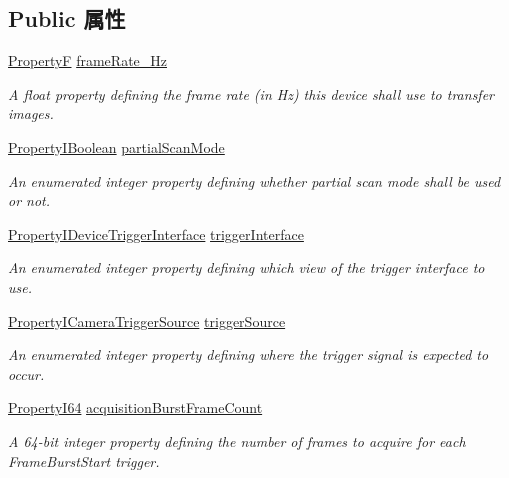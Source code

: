 \subsection*{Public 属性}
\begin{DoxyCompactItemize}
\item 
\hyperlink{group___common_interface_gaf54865fe5a3d5cfd15f9a111b40d09f9}{Property\+F} \hyperlink{classmv_i_m_p_a_c_t_1_1acquire_1_1_camera_settings_blue_c_o_u_g_a_r_a56f237d32d0634054baf9f760c9d4c87}{frame\+Rate\+\_\+\+Hz}
\begin{DoxyCompactList}\small\item\em A float property defining the frame rate (in Hz) this device shall use to transfer images. \end{DoxyCompactList}\item 
\hyperlink{group___common_interface_ga44f9437e24b21b6c93da9039ec6786aa}{Property\+I\+Boolean} \hyperlink{classmv_i_m_p_a_c_t_1_1acquire_1_1_camera_settings_blue_c_o_u_g_a_r_af8680084295e56406aa41e2162204d79}{partial\+Scan\+Mode}
\begin{DoxyCompactList}\small\item\em An enumerated integer property defining whether partial scan mode shall be used or not. \end{DoxyCompactList}\item 
\hyperlink{group___device_specific_interface_gabc51afc4a0e6c169f166ee32bbe45b78}{Property\+I\+Device\+Trigger\+Interface} \hyperlink{classmv_i_m_p_a_c_t_1_1acquire_1_1_camera_settings_blue_c_o_u_g_a_r_a75591b5a8fc64719066e621a3b9adf47}{trigger\+Interface}
\begin{DoxyCompactList}\small\item\em An enumerated integer property defining which view of the trigger interface to use. \end{DoxyCompactList}\item 
\hyperlink{group___device_specific_interface_ga40354af1fd85b454ec1b4e5ca007755d}{Property\+I\+Camera\+Trigger\+Source} \hyperlink{classmv_i_m_p_a_c_t_1_1acquire_1_1_camera_settings_blue_c_o_u_g_a_r_adee3dae10aa14fd0f808d94133c847b4}{trigger\+Source}
\begin{DoxyCompactList}\small\item\em An enumerated integer property defining where the trigger signal is expected to occur. \end{DoxyCompactList}\item 
\hyperlink{group___common_interface_ga81749b2696755513663492664a18a893}{Property\+I64} \hyperlink{classmv_i_m_p_a_c_t_1_1acquire_1_1_camera_settings_blue_c_o_u_g_a_r_a7c28e067bd7ce1304cc681ac1f176c24}{acquisition\+Burst\+Frame\+Count}
\begin{DoxyCompactList}\small\item\em A 64-\/bit integer property defining the number of frames to acquire for each Frame\+Burst\+Start trigger. \end{DoxyCompactList}\end{DoxyCompactItemize}
